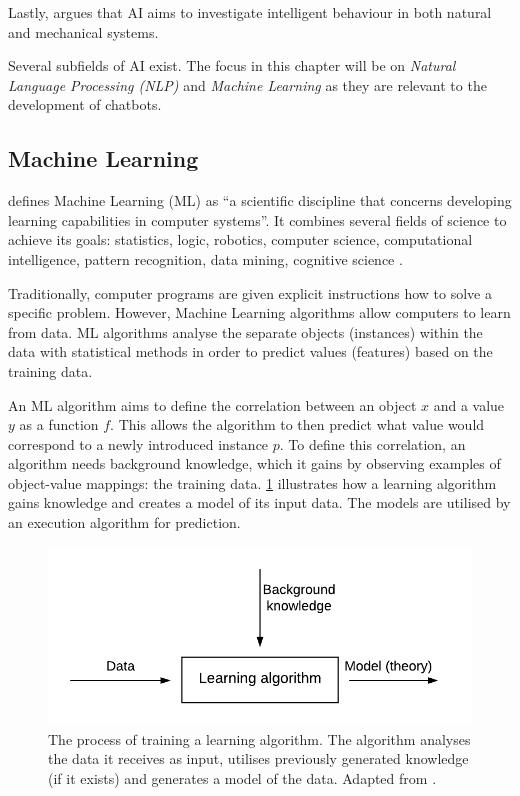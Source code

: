 \documentclass[12pt,a4paper]{article}
\newcommand{\captionstyle}[1] {
    \small{#1}
}
\begin{document}
Lastly, \citep{Poole:1997:CIL:275594} argues that AI aims to investigate intelligent behaviour in both natural and mechanical systems.

Several subfields of AI exist. The focus in this chapter will be on \textit{Natural Language Processing (NLP)} and \textit{Machine Learning} as they are relevant to the development of chatbots.

\subsection{Machine Learning}
\citet{Wojtusiak2012} defines Machine Learning (ML) as \enquote{a scientific discipline that	concerns developing learning capabilities in computer systems}. It combines several fields of science to achieve its goals: statistics, logic, robotics, computer science, computational  intelligence, pattern recognition, data mining, cognitive science \citep{Wojtusiak2012}.

Traditionally, computer programs are given explicit instructions how to solve a specific problem. However, Machine Learning algorithms allow computers to learn from data. ML algorithms analyse the separate objects (instances) within the data with statistical methods in order to predict values (features) based on the training data. 

An ML algorithm aims to define the correlation between an object $x$ and a value $y$ as a function $f$. This allows the algorithm to then predict what value would correspond to a newly introduced instance $p$. To define this correlation, an algorithm needs background knowledge, which it gains by observing examples of object-value mappings: the training data. \cref{fig:mlalgo} illustrates how a learning algorithm gains knowledge and creates a model of its input data. The models are utilised by an execution algorithm for prediction.

\begin{figure}[htb]%
	\centering
	\includegraphics[width=0.7\columnwidth]{mlalgo}%
	\caption[The process of training a learning algorithm.]{\captionstyle{The process of training a learning algorithm. The algorithm analyses the data it receives as input, utilises previously generated knowledge (if it exists) and generates a model of the data. Adapted from \citep{Kononenko2007}.}}%
	\label{fig:mlalgo}%
\end{figure}
\end{document}
